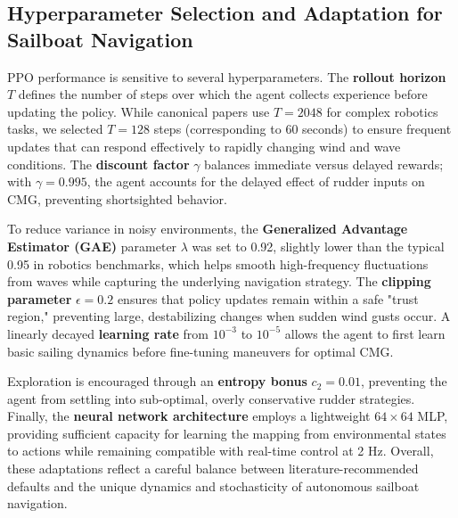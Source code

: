 \subsection{Hyperparameter Selection and Adaptation for Sailboat Navigation}

PPO performance is sensitive to several hyperparameters. The \textbf{rollout horizon} $T$ defines the number of steps over which the agent collects experience before updating the policy. While canonical papers use $T=2048$ for complex robotics tasks, we selected $T=128$ steps (corresponding to 60 seconds) to ensure frequent updates that can respond effectively to rapidly changing wind and wave conditions. The \textbf{discount factor} $\gamma$ balances immediate versus delayed rewards; with $\gamma=0.995$, the agent accounts for the delayed effect of rudder inputs on CMG, preventing shortsighted behavior.  

To reduce variance in noisy environments, the \textbf{Generalized Advantage Estimator (GAE)} parameter $\lambda$ was set to 0.92, slightly lower than the typical 0.95 in robotics benchmarks, which helps smooth high-frequency fluctuations from waves while capturing the underlying navigation strategy. The \textbf{clipping parameter} $\epsilon=0.2$ ensures that policy updates remain within a safe "trust region," preventing large, destabilizing changes when sudden wind gusts occur. A linearly decayed \textbf{learning rate} from $10^{-3}$ to $10^{-5}$ allows the agent to first learn basic sailing dynamics before fine-tuning maneuvers for optimal CMG.  

Exploration is encouraged through an \textbf{entropy bonus} $c_2 = 0.01$, preventing the agent from settling into sub-optimal, overly conservative rudder strategies. Finally, the \textbf{neural network architecture} employs a lightweight $64 \times 64$ MLP, providing sufficient capacity for learning the mapping from environmental states to actions while remaining compatible with real-time control at 2 Hz. Overall, these adaptations reflect a careful balance between literature-recommended defaults and the unique dynamics and stochasticity of autonomous sailboat navigation.
